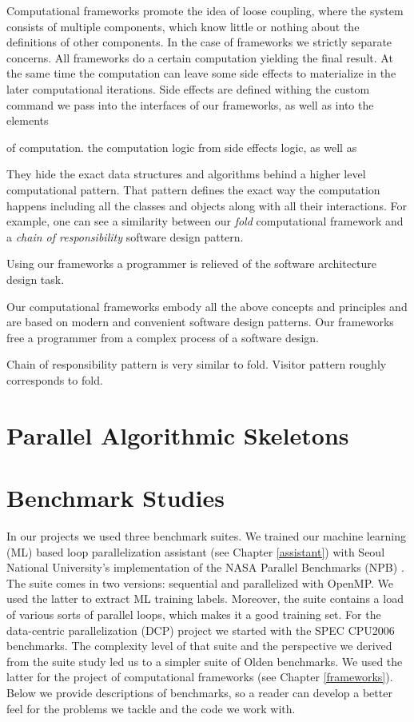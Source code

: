 Computational frameworks promote the idea of loose coupling, where the system consists of multiple components, which know little or nothing about the definitions of other components. In the case of frameworks we strictly separate concerns. All frameworks do a certain computation yielding the final result. At the same time the computation can leave some side effects to materialize in the later computational iterations. Side effects are defined withing the custom command we pass into the interfaces of our frameworks, as well as into the elements  


of computation.  the computation logic from side effects logic, as well as    


They hide the exact data structures and algorithms behind a higher level computational pattern. That pattern defines the exact way the computation happens including all the classes and objects along with all their interactions. For example, one can see a similarity between our \textit{fold} computational framework and a \textit{chain of responsibility} software design pattern.

Using our frameworks a programmer is relieved of the software architecture design task.


Our computational frameworks embody all the above concepts and principles and are based on modern and convenient software design patterns. Our frameworks free a programmer from a complex process of a software design.  

Chain of responsibility pattern is very similar to fold.
Visitor pattern roughly corresponds to fold.

\section{Parallel Algorithmic Skeletons}

\section{Benchmark Studies}
\label{background_benchmarks}
\quad In our projects we used three benchmark suites. We trained our machine learning (ML) based loop parallelization assistant \cite{assistant-aiseps} (see Chapter \ref{assistant}) with Seoul National University's implementation \cite{snu-npb-benchmarks} of the NASA Parallel Benchmarks (NPB) \cite{snu-npb-benchmarks}. The suite comes in two versions: sequential and parallelized with OpenMP. We used the latter to extract ML training labels. Moreover, the suite contains a load of various sorts of parallel loops, which makes it a good training set. For the data-centric parallelization (DCP) project we started with the SPEC CPU2006 benchmarks. The complexity level of that suite and the perspective we derived from the suite study led us to a simpler suite of Olden benchmarks. We used the latter for the project of computational frameworks (see Chapter \ref{frameworks}). Below we provide descriptions of benchmarks, so a reader can develop a better feel for the problems we tackle and the code we work with.
